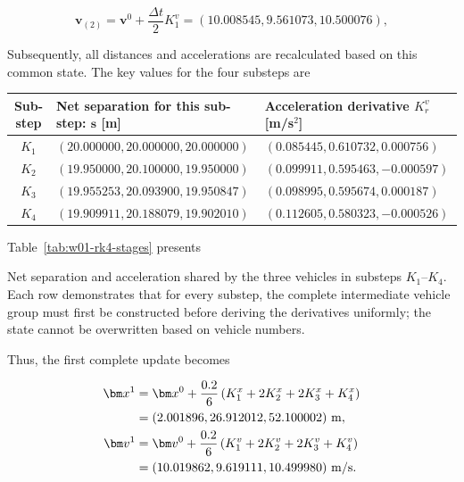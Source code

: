 \documentclass[11pt,a4paper,openany]{book}
\numberwithin{equation}{chapter}
\numberwithin{figure}{chapter}
\numberwithin{table}{chapter}
\newcommand{\tabletext}[2]{%
  \par\smallskip\noindent
  Table~\ref{#1} presents #2
\par\smallskip
}
\begin{document}
\[
\bm v_{(2)}=\bm v^0+\frac{\Delta t}{2}K_1^v
=(10.008545,9.561073,10.500076),
\]




Subsequently, all distances and accelerations are recalculated based on this common state. The key values ​​for the four substeps are






























\begin{center}
\small
{}
\label{tab:w01-rk4-stages}
\begin{tabular}{c p{5.2cm} p{5.2cm}}
\toprule
\textbf{Sub-step} & \textbf{Net separation for this sub-step: $\bm s$ [m]} & \textbf{Acceleration derivative $K_r^v$ [m/s$^2$]}\\
\midrule
$K_1$ & $(20.000000,20.000000,20.000000)$
& $(0.085445,0.610732,0.000756)$\\
$K_2$ & $(19.950000,20.100000,19.950000)$
& $(0.099911,0.595463,-0.000597)$\\
$K_3$ & $(19.955253,20.093900,19.950847)$
& $(0.098995,0.595674,0.000187)$\\
$K_4$ & $(19.909911,20.188079,19.902010)$
& $(0.112605,0.580323,-0.000526)$\\
\bottomrule
\end{tabular}
\end{center}
\tabletext{tab:w01-rk4-stages}{




Net separation and acceleration shared by the three vehicles in substeps $K_1$–$K_4$. Each row demonstrates that for every substep, the complete intermediate vehicle group must first be constructed before deriving the derivatives uniformly; the state cannot be overwritten based on vehicle numbers.}


Thus, the first complete update becomes

\begin{align}
\bm x^1&=\bm x^0+\frac{0.2}{6}
\left(K_1^x+2K_2^x+2K_3^x+K_4^x\right)
\notag\\
&=(2.001896,26.912012,52.100002)\ {\rm m},\\
\bm v^1&=\bm v^0+\frac{0.2}{6}
\left(K_1^v+2K_2^v+2K_3^v+K_4^v\right)
\notag\\
&=(10.019862,9.619111,10.499980)\ {\rm m/s}.
\label{eq:w01-first-update}
\end{align}
\end{document}
